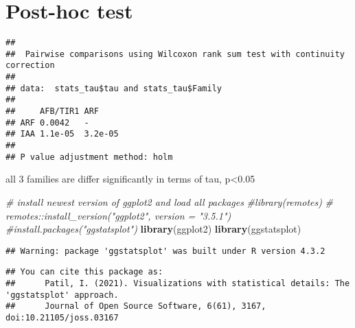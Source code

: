 \documentclass[
]{article}
\newenvironment{Shaded}{\begin{snugshade}}{\end{snugshade}}
\newcommand{\AttributeTok}[1]{\textcolor[rgb]{0.13,0.29,0.53}{#1}}
\newcommand{\CommentTok}[1]{\textcolor[rgb]{0.56,0.35,0.01}{\textit{#1}}}
\newcommand{\FunctionTok}[1]{\textcolor[rgb]{0.13,0.29,0.53}{\textbf{#1}}}
\newcommand{\NormalTok}[1]{#1}
\newcommand{\SpecialCharTok}[1]{\textcolor[rgb]{0.81,0.36,0.00}{\textbf{#1}}}
\newcommand{\StringTok}[1]{\textcolor[rgb]{0.31,0.60,0.02}{#1}}
\begin{document}
\hypertarget{post-hoc-test}{%
\section{Post-hoc test}\label{post-hoc-test}}

\begin{Shaded}
\end{Shaded}

\begin{verbatim}
## 
##  Pairwise comparisons using Wilcoxon rank sum test with continuity correction 
## 
## data:  stats_tau$tau and stats_tau$Family 
## 
##     AFB/TIR1 ARF    
## ARF 0.0042   -      
## IAA 1.1e-05  3.2e-05
## 
## P value adjustment method: holm
\end{verbatim}

all 3 families are differ significantly in terms of tau, p\textless0.05

\begin{Shaded}
\begin{Highlighting}[]
\CommentTok{\# install newest version of ggplot2 and load all packages}
\CommentTok{\#library(remotes)}
\CommentTok{\# remotes::install\_version("ggplot2", version = "3.5.1")}
\CommentTok{\#install.packages("ggstatsplot")}
\FunctionTok{library}\NormalTok{(ggplot2)}
\FunctionTok{library}\NormalTok{(ggstatsplot)}
\end{Highlighting}
\end{Shaded}

\begin{verbatim}
## Warning: package 'ggstatsplot' was built under R version 4.3.2
\end{verbatim}

\begin{verbatim}
## You can cite this package as:
##      Patil, I. (2021). Visualizations with statistical details: The 'ggstatsplot' approach.
##      Journal of Open Source Software, 6(61), 3167, doi:10.21105/joss.03167
\end{verbatim}
\end{document}
